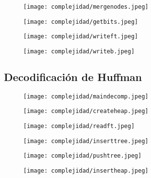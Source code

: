 \documentclass[12 pt]{report}
\begin{document}
\begin{figure}[h!]
  \texttt{[image: complejidad/mergenodes.jpeg]}
  \caption{\label{fig:Unir dos nodos a un ancestro comun} }
\end{figure}
\newpage
\begin{figure}[h!]
  \texttt{[image: complejidad/getbits.jpeg]}
  \caption{\label{fig:Obtener la codificación correspondiente} }
\end{figure}
\begin{figure}[h!]
  \texttt{[image: complejidad/writeft.jpeg]}
  \caption{\label{fig:Escribir la tabla de frecuencias} }
\end{figure}
\newpage
\begin{figure}[h!]
  \texttt{[image: complejidad/writeb.jpeg]}
  \caption{\label{fig:Escribir el archivo compreso} }
\end{figure}
\newpage
\subsection*{Decodificación de Huffman}
\begin{figure}[h!]
  \centering
  \texttt{[image: complejidad/maindecomp.jpeg]}
  \caption{\label{fig:Main de la decodificación} }
\end{figure}
\newpage

\begin{figure}[h!]
  \centering
  \texttt{[image: complejidad/createheap.jpeg]}
  \caption{\label{fig:Reservar el espacio del montículo} }
\end{figure}

\begin{figure}[h!]
  \centering
  \texttt{[image: complejidad/readft.jpeg]}
  \caption{\label{fig:Leer la tabla de frecuencias}}
\end{figure}
\newpage
\begin{figure}[h!]
  \centering
  \texttt{[image: complejidad/inserttree.jpeg]}
  \caption{\label{fig:Insertar nodos en la cola de prioridad} }
\end{figure}

\begin{figure}[h!]
  \centering
  \texttt{[image: complejidad/pushtree.jpeg]}
  \caption{\label{fig:Insertar datos en los nodos} }
\end{figure}

\begin{figure}[h!]
  \centering
  \texttt{[image: complejidad/insertheap.jpeg]}
  \caption{\label{fig:Insercion en la cola de prioridad} }
\end{figure}
\newpage
\end{document}
